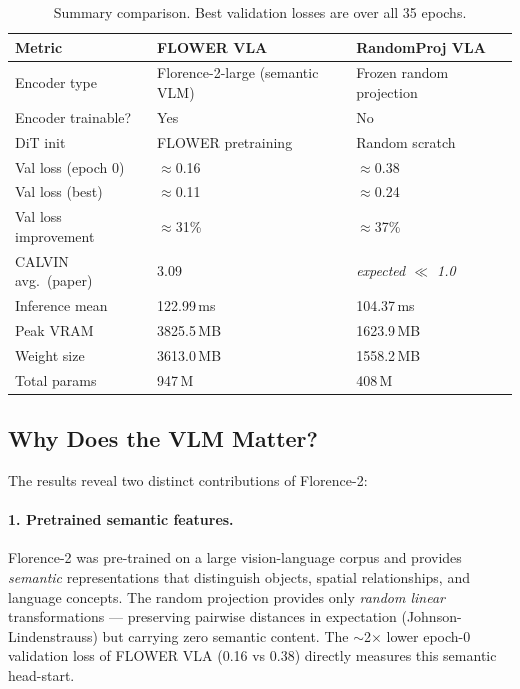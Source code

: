 \documentclass[11pt,a4paper]{article}
\begin{document}
\begin{table}[h]
\centering
{}
\begin{tabular}{lll}
\toprule
\textbf{Metric} & \textbf{FLOWER VLA} & \textbf{RandomProj VLA} \\
\midrule
Encoder type          & Florence-2-large (semantic VLM) & Frozen random projection \\
Encoder trainable?    & Yes & No \\
DiT init              & FLOWER pretraining              & Random scratch \\
Val loss (epoch 0)    & $\approx$0.16                   & $\approx$0.38 \\
Val loss (best)       & $\approx$0.11                   & $\approx$0.24 \\
Val loss improvement  & $\approx$31\%                   & $\approx$37\% \\
CALVIN avg.\ (paper)  & 3.09                            & \textit{expected $\ll$ 1.0} \\
Inference mean        & 122.99\,ms            & 104.37\,ms \\
Peak VRAM             & 3825.5\,MB                  & 1623.9\,MB \\
Weight size           & 3613.0\,MB                & 1558.2\,MB \\
Total params          & 947\,M             & 408\,M \\
\bottomrule
\end{tabular}
\caption{Summary comparison.  Best validation losses are over all 35 epochs.}
\label{tab:summary}
\end{table}

\subsection{Why Does the VLM Matter?}

The results reveal two distinct contributions of Florence-2:

\paragraph{1. Pretrained semantic features.}
Florence-2 was pre-trained on a large vision-language corpus and provides
\emph{semantic} representations that distinguish objects, spatial relationships,
and language concepts.  The random projection provides only \emph{random
linear} transformations — preserving pairwise distances in expectation (Johnson-Lindenstrauss)
but carrying zero semantic content.
The $\sim$2$\times$ lower epoch-0 validation loss of FLOWER VLA (0.16 vs 0.38)
directly measures this semantic head-start.
\end{document}

